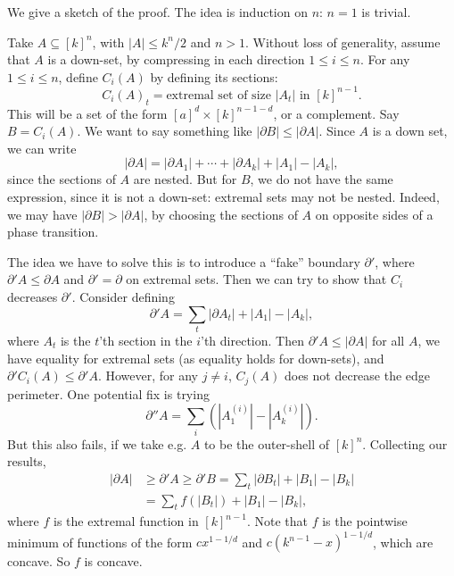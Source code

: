 \documentclass[12pt]{article}
\begin{document}
\begin{proofbox}
	We give a sketch of the proof. The idea is induction on $n$: $n = 1$ is trivial.

	Take $A \subseteq [k]^{n}$, with $|A| \leq k^{n}/2$ and $n > 1$. Without loss of generality, assume that $A$ is a down-set, by compressing in each direction $1 \leq i \leq n$. For any $1 \leq i \leq n$, define $C_i(A)$ by defining its sections:
	\[
		C_i(A)_t = \text{extremal set of size } |A_t| \text{ in } [k]^{n-1}.
	\]
	This will be a set of the form $[a]^{d} \times [k]^{n - 1 - d}$, or a complement. Say $B = C_i(A)$. We want to say something like $|\partial B| \leq |\partial A|$. Since $A$ is a down set, we can write
	\[
	|\partial A| = |\partial A_1| + \cdots + |\partial A_k| + |A_1| - |A_k|,
	\]
	since the sections of $A$ are nested. But for $B$, we do not have the same expression, since it is not a down-set: extremal sets may not be nested. Indeed, we may have $|\partial B| > |\partial A|$, by choosing the sections of $A$ on opposite sides of a phase transition.

	The idea we have to solve this is to introduce a ``fake'' boundary $\partial'$, where $\partial' A \leq \partial A$ and $\partial' = \partial$ on extremal sets. Then we can try to show that $C_i$ decreases $\partial'$. Consider defining
	\[
	\partial' A = \sum_t |\partial A_t| + |A_1| - |A_k|,
	\]
	where $A_t$ is the $t$'th section in the $i$'th direction. Then $\partial' A \leq |\partial A|$ for all $A$, we have equality for extremal sets (as equality holds for down-sets), and $\partial' C_i(A) \leq \partial ' A$. However, for any $j \neq i$, $C_j(A)$ does not decrease the edge perimeter. One potential fix is trying
	\[
	\partial'' A = \sum_i (|A_1^{(i)}| - |A_k^{(i)}|).
	\]
	But this also fails, if we take e.g. $A$ to be the outer-shell of $[k]^{n}$. Collecting our results,
	\begin{align*}
		|\partial A| &\geq \partial ' A \geq \partial' B = \sum_t |\partial B_t| + |B_1| - |B_k| \\
			     &= \sum_t f(|B_t|) + |B_1| - |B_k|,
	\end{align*}
	where $f$ is the extremal function in $[k]^{n-1}$. Note that $f$ is the pointwise minimum of functions of the form $c x^{1- 1/d}$ and $c (k^{n-1} - x)^{1 - 1/d}$, which are concave. So $f$ is concave.


\end{proofbox}
\end{document}
